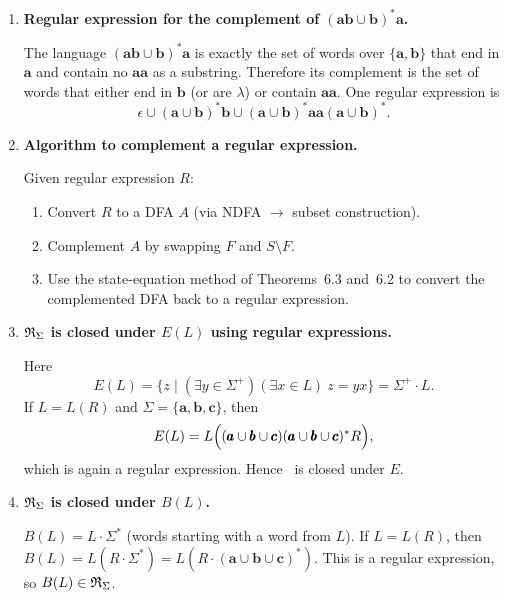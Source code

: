 \begin{enumerate}[{6.}1.]
\begin{enumerate}[(a)]
  \item \textbf{General formula:}  For a machine $A$ with start states $s_{i_1},\ldots,s_{i_m}$:
  \[
    L(A) = X_{i_1} \cup X_{i_2} \cup \cdots \cup X_{i_m}
  \]
  where each $X_j$ is the solution to the state equation for state $s_j$.
\end{enumerate}

\item \textbf{Regular expression for the complement of $(\pmb{ab}\cup\pmb{b})^*\pmb{a}$.}

The language $(\pmb{ab}\cup\pmb{b})^*\pmb{a}$ is exactly the set of words over
$\{\pmb{a},\pmb{b}\}$ that end in $\pmb{a}$ and contain no $\pmb{aa}$ as a
substring.  Therefore its complement is the set of words that either end in
$\pmb{b}$ (or are $\lambda$) or contain $\pmb{aa}$.  One regular expression is
\[
  \epsilon \cup (\pmb{a}\cup\pmb{b})^*\pmb{b}
  \cup (\pmb{a}\cup\pmb{b})^*\pmb{aa}(\pmb{a}\cup\pmb{b})^*.
\]

\item \textbf{Algorithm to complement a regular expression.}

Given regular expression $R$:
\begin{enumerate}[1.]
  \item Convert $R$ to a DFA $A$ (via NDFA $\to$ subset construction).
  \item Complement $A$ by swapping $F$ and $S\setminus F$.
  \item Use the state-equation method of Theorems~6.3 and~6.2 to convert the complemented DFA back to a regular expression.
\end{enumerate}

\item \textbf{$\mathfrak{R}_\Sigma$ is closed under $E(L)$ using regular expressions.}

Here
\[
E(L)=\{z\mid(\exists y\in\Sigma^+)(\exists x\in L)\ z=yx\}=\Sigma^+\cdot L.
\]
If $L=L(R)$ and $\Sigma=\{\pmb{a},\pmb{b},\pmb{c}\}$, then
\[
E(L)=L\Bigl((\pmb{a}\cup\pmb{b}\cup\pmb{c})(\pmb{a}\cup\pmb{b}\cup\pmb{c})^*R\Bigr),
\]
which is again a regular expression.  Hence \RSIG\ is closed under $E$.

\item \textbf{$\mathfrak{R}_\Sigma$ is closed under $B(L)$.}

$B(L)=L\cdot\Sigma^*$ (words starting with a word from $L$).  If $L=L(R)$, then $B(L)=L(R\cdot\Sigma^*)=L(R\cdot(\pmb{a}\cup\pmb{b}\cup\pmb{c})^*)$.  This is a regular expression, so $B(L)\in\mathfrak{R}_\Sigma$.


\end{enumerate}
